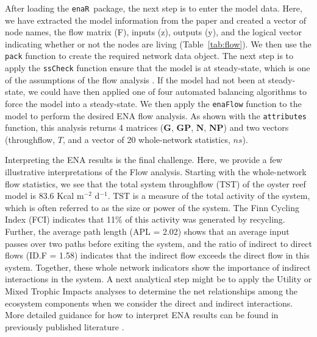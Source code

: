 \documentclass[11pt]{article}
\newcommand{\R}{R}
\newcommand{\enaR}{\texttt{enaR}}
\begin{document}
\begin{spacing}{2}
After loading the \enaR\ package, the next step is to enter the model
data.  
Here, we have extracted the model information from the paper and
created a vector of node names, the flow matrix (F), inputs (z),
outputs (y), and the logical vector indicating whether or not the
nodes are living (Table~\ref{tab:flow}).  We then use the
\texttt{pack} function to create the required network data object.
The next step is to apply the \texttt{ssCheck} function ensure that
the model is at steady-state, which is one of the assumptions of the
flow analysis \citep{finn76, fath06}.  If the model had not been at
steady-state, we could have then applied one of four automated
balancing algorithms \citet[AVG, Input-Output, Output-Input,
AVG2,][]{allesina03} to force the model into a steady-state.  We then
apply the \texttt{enaFlow} function to the model to perform the
desired ENA flow analysis.  As shown with the \texttt{attributes}
function, this analysis returns 4 matrices ($\mathbf{G}$,
$\mathbf{GP}$, $\mathbf{N}$, $\mathbf{NP}$) and two vectors
(throughflow, $T$, and a vector of 20 whole-network statistics, $ns$).

Interpreting the ENA results is the final challenge.  Here, we provide
a few illustrative interpretations of the Flow analysis.  Starting
with the whole-network flow statistics, we see that the total system
throughflow (TST) of the oyster reef model is 83.6 Kcal m$^{-2}$
d$^{-1}$. TST is a measure of the total activity of the system, which
is often referred to as the size or power of the system.  The Finn
Cycling Index (FCI) indicates that 11\% of this activity was generated
by recycling.  Further, the average path length (APL = 2.02) shows
that an average input passes over two paths before exiting the system,
and the ratio of indirect to direct flows (ID.F = 1.58) indicates that
the indirect flow exceeds the direct flow in this system.  Together,
these whole network indicators show the importance of indirect
interactions in the system.  A next analytical step might be to apply
the Utility or Mixed Trophic Impacts analyses to determine the net
relationships among the ecosystem components when we consider the
direct and indirect interactions.  
More detailed guidance for how to interpret ENA results can be found
in previously published literature \citep{fath06, schramski11,
  jorgensen07_newecology}.



\end{spacing}
\end{document}
